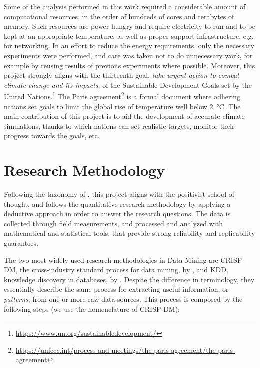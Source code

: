 \documentclass[a4paper,11pt]{kth-mag}
\begin{document}
Some of the analysis performed in this work required a considerable amount of computational resources, in the order of hundreds of cores and terabytes of memory. Such resources are power hungry and require electricity to run and to be kept at an appropriate temperature, as well as proper support infrastructure, e.g. for networking. In an effort to reduce the energy requirements, only the necessary experiments were performed, and care was taken not to do unnecessary work, for example by reusing results of previous experiments where possible. Moreover, this project strongly aligns with the thirteenth goal, \emph{take urgent action to combat climate change and its impacts}, of the Sustainable Development Goals set by the United Nations.\footnote{\url{https://www.un.org/sustainabledevelopment/}} The Paris agreement\footnote{\url{https://unfccc.int/process-and-meetings/the-paris-agreement/the-paris-agreement}} is a formal document where adhering nations set goals to limit the global rise of temperature well below \SI{2}{\celsius}. The main contribution of this project is to aid the development of accurate climate simulations, thanks to which nations can set realistic targets, monitor their progress towards the goals, etc.

\section{Research Methodology}
\label{sec:research_methodology}
Following the taxonomy of \cite{research_bs}, this project aligns with the positivist school of thought, and follows the quantitative research methodology by applying a deductive approach in order to answer the research questions. The data is collected through field measurements, and processed and analyzed with mathematical and statistical tools, that provide strong reliability and replicability guarantees.

The two most widely used research methodologies in Data Mining are CRISP-DM, the cross-industry standard process for data mining, by \cite{crispdm}, and KDD, knowledge discovery in databases, by \cite{kdd}. Despite the difference in terminology, they essentially describe the same process for extracting useful information, or \emph{patterns}, from one or more raw data sources. This process is composed by the following steps (we use the nomenclature of CRISP-DM):
\end{document}
